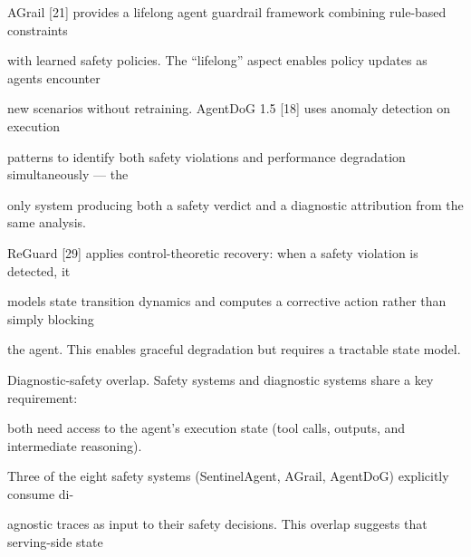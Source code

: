\begin{flushleft}
\noindent  AGrail [21] provides a lifelong agent guardrail framework combining rule-based constraints\par
\noindent with learned safety policies. The “lifelong” aspect enables policy updates as agents encounter\par
\noindent new scenarios without retraining. AgentDoG 1.5 [18] uses anomaly detection on execution\par
\noindent patterns to identify both safety violations and performance degradation simultaneously — the\par
\noindent only system producing both a safety verdict and a diagnostic attribution from the same analysis.\par
\noindent  ReGuard [29] applies control-theoretic recovery: when a safety violation is detected, it\par
\noindent models state transition dynamics and computes a corrective action rather than simply blocking\par
\noindent the agent. This enables graceful degradation but requires a tractable state model.\par
\par\smallskip
\noindent Diagnostic-safety overlap. Safety systems and diagnostic systems share a key requirement:\par
\noindent both need access to the agent’s execution state (tool calls, outputs, and intermediate reasoning).\par
\noindent Three of the eight safety systems (SentinelAgent, AGrail, AgentDoG) explicitly consume di-\par
\noindent agnostic traces as input to their safety decisions. This overlap suggests that serving-side state\par
\end{flushleft}
